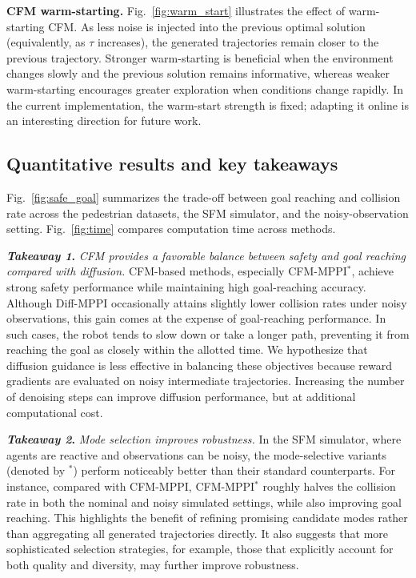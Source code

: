 \documentclass[letterpaper,10 pt,conference]{ieeeconf}
\begin{document}
\noindent\textbf{CFM warm-starting.}
Fig.~\ref{fig:warm_start} illustrates the effect of warm-starting CFM. 
As less noise is injected into the previous optimal solution (equivalently, as $\tau$ increases), the generated trajectories remain closer to the previous trajectory. 
Stronger warm-starting is beneficial when the environment changes slowly and the previous solution remains informative, whereas weaker warm-starting encourages greater exploration when conditions change rapidly. 
In the current implementation, the warm-start strength is fixed; adapting it online is an interesting direction for future work.

\subsection{Quantitative results and key takeaways} \label{subsec:results}

Fig.~\ref{fig:safe_goal} summarizes the trade-off between goal reaching and collision rate across the pedestrian datasets, the SFM simulator, and the noisy-observation setting. 
Fig.~\ref{fig:time} compares computation time across methods.

\noindent \textbf{\textit{Takeaway 1}.}
\textit{CFM provides a favorable balance between safety and goal reaching compared with diffusion.}
CFM-based methods, especially CFM-MPPI$^*$, achieve strong safety performance while maintaining high goal-reaching accuracy.
Although Diff-MPPI occasionally attains slightly lower collision rates under noisy observations, this gain comes at the expense of goal-reaching performance. 
In such cases, the robot tends to slow down or take a longer path, preventing it from reaching the goal as closely within the allotted time. 
We hypothesize that diffusion guidance is less effective in balancing these objectives because reward gradients are evaluated on noisy intermediate trajectories. 
Increasing the number of denoising steps can improve diffusion performance, but at additional computational cost.

\noindent\textbf{\textit{Takeaway 2}.}
\textit{Mode selection improves robustness.} 
In the SFM simulator, where agents are reactive and observations can be noisy, the mode-selective variants (denoted by $^*$) perform noticeably better than their standard counterparts.
For instance, compared with CFM-MPPI, CFM-MPPI$^*$ roughly halves the collision rate in both the nominal and noisy simulated settings, while also improving goal reaching.
This highlights the benefit of refining promising candidate modes rather than aggregating all generated trajectories directly. 
It also suggests that more sophisticated selection strategies, for example, those that explicitly account for both quality and diversity, may further improve robustness.
\end{document}
